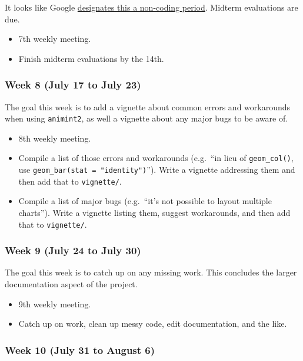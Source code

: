 \documentclass[
]{article}
\providecommand{\tightlist}{%
  \setlength{\itemsep}{0pt}\setlength{\parskip}{0pt}}\usepackage{longtable,booktabs,array}
\begin{document}
It looks like Google
\href{https://developers.google.com/open-source/gsoc/timeline}{designates
this a non-coding period}. Midterm evaluations are due.

\begin{itemize}
\tightlist
\item
  7th weekly meeting.
\item
  Finish midterm evaluations by the 14th.
\end{itemize}

\hypertarget{week-8-july-17-to-july-23}{%
\subsubsection{Week 8 (July 17 to July
23)}\label{week-8-july-17-to-july-23}}

The goal this week is to add a vignette about common errors and
workarounds when using \texttt{animint2}, as well a vignette about any
major bugs to be aware of.

\begin{itemize}
\tightlist
\item
  8th weekly meeting.
\item
  Compile a list of those errors and workarounds (e.g.~``in lieu of
  \texttt{geom\_col()}, use \texttt{geom\_bar(stat\ =\ "identity")}'').
  Write a vignette addressing them and then add that to
  \texttt{vignette/}.
\item
  Compile a list of major bugs (e.g.~``it's not possible to layout
  multiple charts''). Write a vignette listing them, suggest
  workarounds, and then add that to \texttt{vignette/}.
\end{itemize}

\hypertarget{week-9-july-24-to-july-30}{%
\subsubsection{Week 9 (July 24 to July
30)}\label{week-9-july-24-to-july-30}}

The goal this week is to catch up on any missing work. This concludes
the larger documentation aspect of the project.

\begin{itemize}
\tightlist
\item
  9th weekly meeting.
\item
  Catch up on work, clean up messy code, edit documentation, and the
  like.
\end{itemize}

\hypertarget{week-10-july-31-to-august-6}{%
\subsubsection{Week 10 (July 31 to August
6)}\label{week-10-july-31-to-august-6}}
\end{document}
